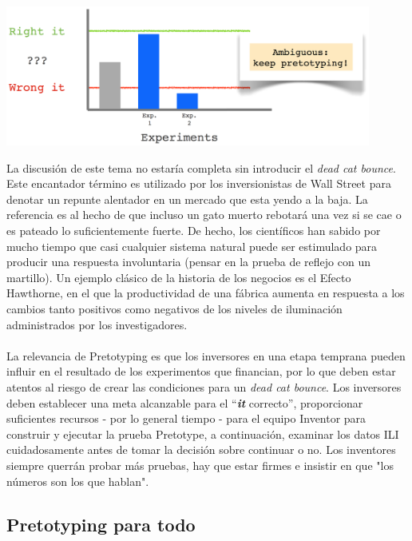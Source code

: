 \documentclass{article}
\begin{document}
\begin{center}
    \includegraphics[width=0.9\textwidth]{experimento_3}
\end{center}

La discusi\'on de este tema no estar\'ia completa sin introducir el \textit{dead cat bounce}. Este encantador t\'ermino es utilizado por los inversionistas de Wall Street para denotar un repunte alentador en un mercado que esta yendo a la baja. La referencia es al hecho de que incluso un gato muerto rebotar\'a una vez si se cae o es pateado lo suficientemente fuerte. De hecho, los cient\'ificos han sabido por mucho tiempo que casi cualquier sistema natural puede ser estimulado para producir una respuesta involuntaria (pensar en la prueba de reflejo con un martillo). Un ejemplo cl\'asico de la historia de los negocios es el Efecto Hawthorne, en el que la productividad de una f\'abrica aumenta en respuesta a los cambios tanto positivos como negativos de los niveles de iluminaci\'on administrados por los investigadores.
\\ \\
La relevancia de Pretotyping es que los inversores en una etapa temprana pueden influir en el resultado de los experimentos que financian, por lo que deben estar atentos al riesgo de crear las condiciones para un \textit{dead cat bounce}. Los inversores deben establecer una meta alcanzable para el ``\textbf{\textit{it}} correcto'', proporcionar suficientes recursos - por lo general tiempo - para el equipo Inventor para construir y ejecutar la prueba Pretotype, a continuaci\'on, examinar los datos ILI cuidadosamente antes de tomar la decisi\'on sobre continuar o no. Los inventores siempre querr\'an probar m\'as pruebas, hay que estar firmes e insistir en que "los n\'umeros son los que hablan".
\clearpage

\subsection{Pretotyping para todo}
\end{document}
